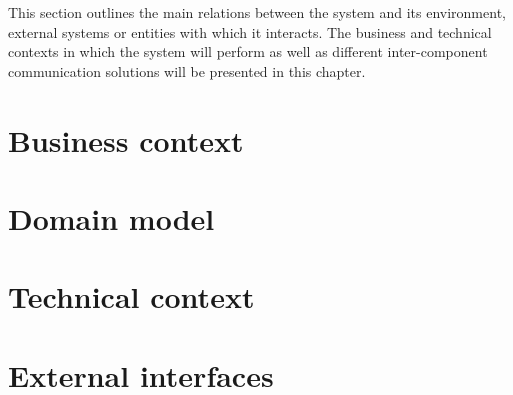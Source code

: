 This section outlines the main relations between the system and its environment, external systems or entities with which it interacts. The business and technical contexts in which the system will perform as well as different inter-component communication solutions will be presented in this chapter.

\section{Business context}
\label{sec:business_context}


\section{Domain model}
\label{sec:domain_model}


\section{Technical context}
\label{sec:technical_context}


\section{External interfaces}
\label{sec:ext_interfaces}
